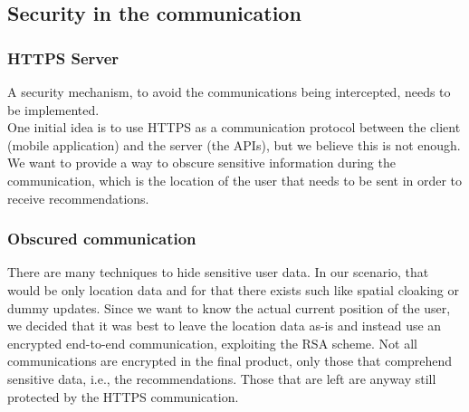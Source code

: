 \documentclass[../../main]{subfiles}
\begin{document}
\subsection{Security in the communication}
\label{ss:security-in-communication}

\subsubsection{HTTPS Server}
\label{sss:https-server}
A security mechanism, to avoid the communications being intercepted, needs to be implemented.\\
One initial idea is to use HTTPS as a communication protocol between the client (mobile application) and the server (the APIs), but we believe this is not enough.
We want to provide a way to obscure sensitive information during the communication, which is the location of the user that needs to be sent in order to receive recommendations.

\subsubsection{Obscured communication}
\label{sss:obscured-communication}
There are many techniques to hide sensitive user data. In our scenario, that would be only location data and for that there exists such like spatial cloaking or dummy updates.
Since we want to know the actual current position of the user, we decided that it was best to leave the location data as-is and instead use an encrypted end-to-end communication, exploiting the RSA scheme.
Not all communications are encrypted in the final product, only those that comprehend sensitive data, i.e., the recommendations.
Those that are left are anyway still protected by the HTTPS communication.
\end{document}
